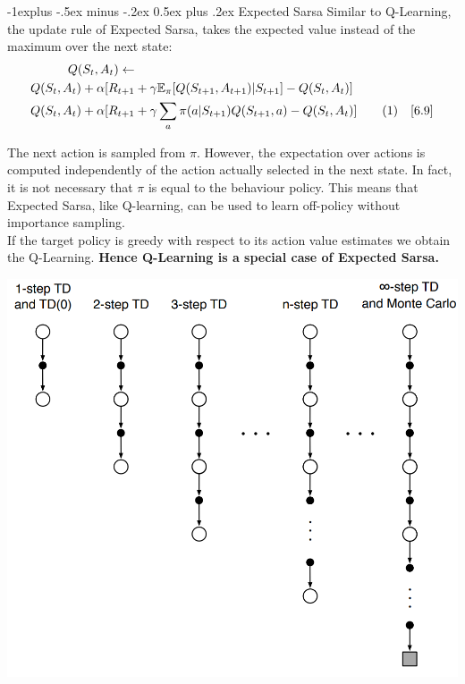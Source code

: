 \documentclass[10pt,landscape]{article}
\makeatletter
\renewcommand{\section}{\@startsection{section}{1}{0mm}%
                                {-1ex plus -.5ex minus -.2ex}%
                                {0.5ex plus .2ex}%
                                {\normalfont\large\bfseries}}
\renewcommand{\subsection}{\@startsection{subsection}{2}{0mm}%
                                {-1explus -.5ex minus -.2ex}%
                                {0.5ex plus .2ex}%
                                {\normalfont\normalsize\bfseries}}
\newcommand\numberthis{\addtocounter{equation}{1}\tag{\theequation}}
\makeatother
\begin{document}
\begin{multicols}{3}
\subsection{Expected Sarsa}
Similar to Q-Learning, the update rule of Expected Sarsa, takes the expected value instead of the maximum over the next state:
\begin{align*}
    Q(S_t, A_t)  \leftarrow & \\
    Q(S_t, A_t) + \alpha [R_{t+1} & + \gamma \mathbb{E}_{\pi} [ Q(S_{t+1}, A_{t+1}) | S_{t+1} ] - Q(S_t, A_t) ] \\
    Q(S_t, A_t) + \alpha [R_{t+1} & + \gamma \sum_a \pi(a| S_{t+1}) Q(S_{t+1}, a) - Q(S_t, A_t)] \numberthis \quad [6.9]   
\end{align*}

The next action is sampled from $\pi$. However, the expectation over actions is computed independently of the action actually selected in the next state. 
In fact, it is not necessary that $\pi$ is equal to the behaviour policy. This means that Expected Sarsa, like Q-learning, can be used to learn off-policy without importance sampling. \\
If the target policy is greedy with respect to its action value estimates we obtain the Q-Learning. \textbf{Hence Q-Learning is a special case of Expected Sarsa.}


\begin{center}
    \includegraphics[width=0.9\linewidth]{images/nstep_backup.png}
\end{center}


\end{multicols}
\end{document}
